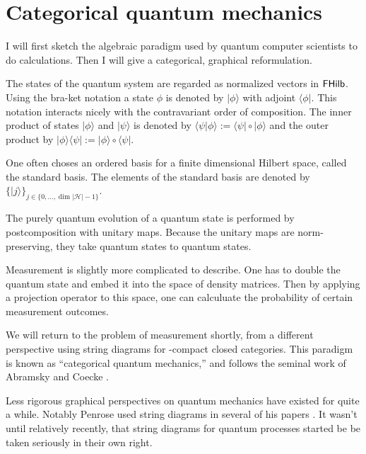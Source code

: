 \section{Categorical quantum mechanics}
\label{sec:cqm}

I will first sketch the algebraic paradigm used by quantum computer scientists to do calculations.  Then I will give a categorical, graphical reformulation.

The states of the quantum system are regarded as normalized vectors in $\mathsf{FHilb}$. Using the bra-ket notation a state $\phi$ is denoted by  $|\phi\rangle$ with adjoint $\langle \phi|$. This notation interacts nicely with the contravariant order of composition.  The inner product of states $|\phi\rangle$ and  $|\psi\rangle$ is denoted by  $\langle \psi |\phi\rangle:= \langle \psi|\circ |\phi\rangle$ and the outer product by $|\phi\rangle\langle \psi | := |\phi\rangle\circ\langle \psi |$.

One often choses an ordered basis for a finite dimensional Hilbert space, called the standard basis.  The elements of the standard basis are denoted by $\{ | j  \rangle\}_{j\in \{0,\ldots, \dim|\mathcal{H}|-1\}} $. %

The purely quantum evolution of a quantum state is performed by postcomposition with unitary maps.  Because the unitary maps are norm-preserving, they take quantum states to quantum states.


Measurement is slightly more complicated to describe.  One has to double the quantum state and embed it into the space of  density matrices.  Then by applying a projection operator to this space, one can calculuate the probability of certain measurement outcomes.

We will return to the problem of measurement shortly, from a different perspective using string diagrams for \dag-compact closed categories.  This paradigm is known as ``categorical quantum mechanics,'' and follows the seminal work of Abramsky and Coecke \cite{abramsky}. 


Less rigorous graphical perspectives on quantum mechanics have existed for quite a while. Notably Penrose used string diagrams in several of his papers \cite{penrosei,??}. It wasn't until relatively recently, that string diagrams for quantum processes started be be taken seriously in their own right.  


